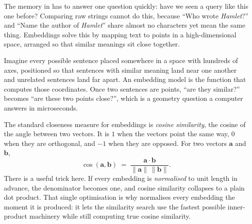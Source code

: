 The memory in \caem{} has to answer one question quickly: have we seen a query
like this one before? Comparing raw strings cannot do this, because ``Who wrote
\emph{Hamlet}?'' and ``Name the author of \emph{Hamlet}'' share almost no
characters yet mean the same thing. Embeddings solve this by mapping text to
points in a high-dimensional space, arranged so that similar meanings sit close
together.

\begin{intuition}
Imagine every possible sentence placed somewhere in a space with hundreds of
axes, positioned so that sentences with similar meaning land near one another and
unrelated sentences land far apart. An embedding model is the function that
computes those coordinates. Once two sentences are points, ``are they similar?''
becomes ``are these two points close?'', which is a geometry question a computer
answers in microseconds.
\end{intuition}

The standard closeness measure for embeddings is \emph{cosine similarity}, the
cosine of the angle between two vectors. It is $1$ when the vectors point the same
way, $0$ when they are orthogonal, and $-1$ when they are opposed. For two
vectors $\mathbf{a}$ and $\mathbf{b}$,
\[
  \cos(\mathbf{a}, \mathbf{b})
  \;=\;
  \frac{\mathbf{a} \cdot \mathbf{b}}{\lVert \mathbf{a}\rVert\,\lVert \mathbf{b}\rVert}.
\]
There is a useful trick here. If every embedding is \emph{normalised} to unit
length in advance, the denominator becomes one, and cosine similarity collapses
to a plain dot product. That single optimisation is why \caem{} normalises every
embedding the moment it is produced: it lets the similarity search use the fastest
possible inner-product machinery while still computing true cosine similarity.

